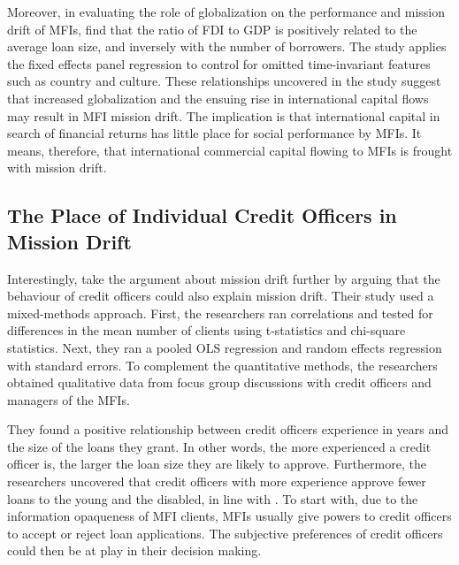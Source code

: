 \documentclass[a4paper,nobind]{templates/ociamthesis}
\begin{document}
\noindent Moreover, in evaluating the role of globalization on the performance and mission drift of MFIs, \textcite{forkusam2014does} find that the ratio of FDI to GDP is positively related to the average loan size, and inversely with the number of borrowers. The study applies the fixed effects panel regression to control for omitted time-invariant features such as country and culture. These relationships uncovered in the study suggest that increased globalization and the ensuing rise in international capital flows may result in MFI mission drift. The implication is that international capital in search of financial returns has little place for social performance by MFIs. It means, therefore, that international commercial capital flowing to MFIs is frought with mission drift.

\hypertarget{the-place-of-individual-credit-officers-in-mission-drift}{%
\subsection{The Place of Individual Credit Officers in Mission Drift}\label{the-place-of-individual-credit-officers-in-mission-drift}}

\noindent Interestingly, \textcite{beisland2019commercialization} take the argument about mission drift further by arguing that the behaviour of credit officers could also explain mission drift. Their study used a mixed-methods approach. First, the researchers ran correlations and tested for differences in the mean number of clients using t-statistics and chi-square statistics. Next, they ran a pooled OLS regression and random effects regression with standard errors. To complement the quantitative methods, the researchers obtained qualitative data from focus group discussions with credit officers and managers of the MFIs.

They found a positive relationship between credit officers experience in years and the size of the loans they grant. In other words, the more experienced a credit officer is, the larger the loan size they are likely to approve. Furthermore, the researchers uncovered that credit officers with more experience approve fewer loans to the young and the disabled, in line with \autocite{labie2015discrimination}. To start with, due to the information opaqueness of MFI clients, MFIs usually give powers to credit officers to accept or reject loan applications. The subjective preferences of credit officers could then be at play in their decision making.
\end{document}
